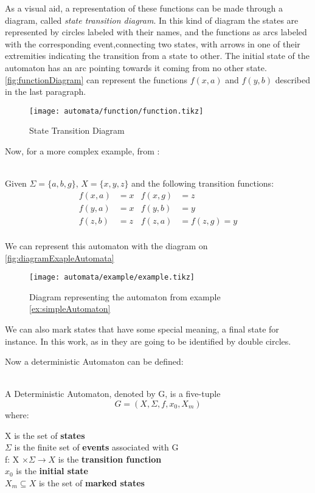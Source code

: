 As a
visual aid, a representation of these functions can be made through a diagram, called \emph{state transition diagram}. In this kind of diagram the states are
represented by circles labeled with their names, and the functions as arcs
labeled with the corresponding event,connecting two states, with arrows in one of their
extremities indicating the transition from a state to other. The initial state
of the automaton has an arc pointing towards it coming from no other state.
\autoref{fig:functionDiagram} can represent the functions $f(x,a)$ and $f(y,b)$
described in the last paragraph.
\begin{figure}[H]
  \centering
  \texttt{[image: automata/function/function.tikz]}
  \caption{State Transition Diagram}
  \label{fig:functionDiagram}
\end{figure}
Now, for a more complex example, from \cite{cassandras2009introduction}:

\begin{example} ~\\
  \label{ex:simpleAutomaton}
  Given $\Sigma = \{a,b,g\}$, $X = \{x,y,z\}$ and the following transition functions:
  \begin{align*}
   f(x,a)&=x&f(x,g)&=z\\
   f(y,a)&=x&f(y,b)&=y\\
   f(z,b)&=z&f(z,a)&=f(z,g)=y\\
 \end{align*}
\end{example}
We can represent this automaton with the diagram on \autoref{fig:diagramExapleAutomata}
\begin{figure}[H]
  \centering
  \texttt{[image: automata/example/example.tikz]}
  \caption{Diagram representing the automaton from example \ref{ex:simpleAutomaton}}
  \label{fig:diagramExapleAutomata}
\end{figure}
We can also mark states that have some special meaning, a final state for instance. In this work, as in \cite{cassandras2009introduction} they are
  going to be identified by double circles.

  
  Now a deterministic Automaton can be defined:
\begin{definition}
  \label{def:DeterministicAutomaton}~\\
  A Deterministic Automaton, denoted by G, is a five-tuple
  \[ G = (X,\Sigma,f, x_0,X_m)\] where:

  \indent X is the set of \textbf{states} \\
  \indent $\Sigma$ is the finite set of \textbf{events} associated with G\\
  \indent f: X $\times \Sigma \rightarrow X$ is the \textbf{transition function}  \\
  \indent $x_0$ is the \textbf{initial state} \\
  \indent $X_m \subseteq X $ is the set of \textbf{marked states}

\end{definition}


